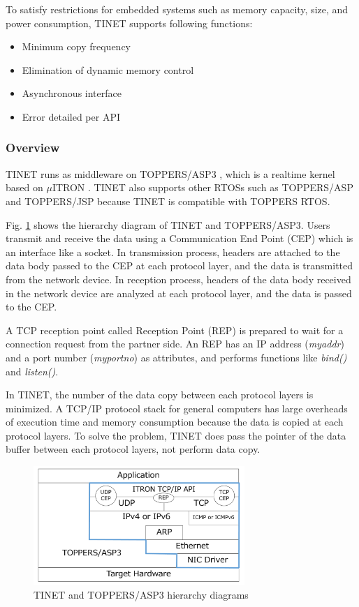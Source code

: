 \documentclass[conference]{IEEEtran/IEEEtran}
\begin{document}
To satisfy restrictions for embedded systems such as memory capacity, size, and power consumption, TINET supports following functions:

\begin{itemize}
    \item Minimum copy frequency
    \item Elimination of dynamic memory control
    \item Asynchronous interface
    \item Error detailed per API
\end{itemize}

\subsubsection{Overview}

TINET runs as middleware on TOPPERS/ASP3 \cite{par:ASP3} \cite{url:ASP3}, which is a realtime kernel based on $\mu$ITRON \cite{par:microITRON}.
TINET also supports other RTOSs such as TOPPERS/ASP and TOPPERS/JSP because TINET is compatible with TOPPERS RTOS.

Fig. \ref{fig:TINETHierarchyDiagram} shows the hierarchy diagram of TINET and TOPPERS/ASP3.
Users transmit and receive the data using a Communication End Point (CEP) which is an interface like a socket.
In transmission process, headers are attached to the data body passed to the CEP at each protocol layer, and the data is transmitted from the network device.
In reception process, headers of the data body received in the network device are analyzed at each protocol layer, and the data is passed to the CEP.

A TCP reception point called Reception Point (REP) is prepared to wait for a connection request from the partner side.
An REP has an IP address ({\it myaddr}) and a port number ({\it myportno}) as attributes, and performs functions like {\it bind()} and {\it listen()}.

In TINET, the number of the data copy between each protocol layers is minimized.
A TCP/IP protocol stack for general computers has large overheads of execution time and memory consumption because the data is copied at each protocol layers.
To solve the problem, TINET does pass the pointer of the data buffer between each protocol layers, not perform data copy.

\begin{figure}[t]
    \centering
    \includegraphics[width=8.0cm,clip]{figure/TINETHierarchyDiagram.pdf}
    \caption{TINET and TOPPERS/ASP3 hierarchy diagrams}
    \label{fig:TINETHierarchyDiagram}
\end{figure}
\end{document}
